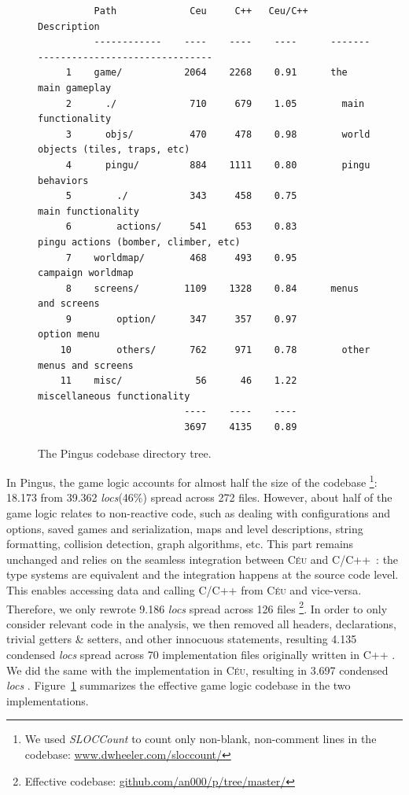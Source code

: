 \documentclass[10pt, conference, compsocconf]{IEEEtran}
\newcommand{\CEU}{\textsc{C\'{e}u}\xspace}
\newcommand{\locs}{\emph{locs}\xspace}
\begin{document}
\begin{figure}
{\footnotesize
\begin{verbatim}
          Path             Ceu     C++   Ceu/C++    Description
          ------------    ----    ----    ----      --------------------------------------
     1    game/           2064    2268    0.91      the main gameplay
     2      ./             710     679    1.05        main functionality
     3      objs/          470     478    0.98        world objects (tiles, traps, etc)
     4      pingu/         884    1111    0.80        pingu behaviors
     5        ./           343     458    0.75          main functionality
     6        actions/     541     653    0.83          pingu actions (bomber, climber, etc)
     7    worldmap/        468     493    0.95      campaign worldmap
     8    screens/        1109    1328    0.84      menus and screens
     9        option/      347     357    0.97        option menu
    10        others/      762     971    0.78        other menus and screens
    11    misc/             56      46    1.22      miscellaneous functionality
                          ----    ----    ----
                          3697    4135    0.89
\end{verbatim}
}
\caption{The Pingus codebase directory tree.
\label{tab.tree}
}
\end{figure}

In Pingus, the game logic accounts for almost half the size of the codebase%
\footnote{
We used \emph{SLOCCount} to count only non-blank, non-comment lines in the
codebase: \url{www.dwheeler.com/sloccount/}
}:
18.173 from 39.362 \locs (46\%) spread across 272 files.
%
However, about half of the game logic relates to non-reactive code, such as
dealing with configurations and options, saved games and serialization, maps
and level descriptions, string formatting, collision detection, graph
algorithms, etc.
This part remains unchanged and relies on the seamless integration between \CEU
and C/C++~\cite{ceu.sensys13}: the type systems are equivalent and the
integration happens at the source code level.
This enables accessing data and calling C/C++ from \CEU and vice-versa.
%
Therefore, we only rewrote 9.186 \locs spread across 126 files%
\footnote{\label{codebase} Effective codebase: \url{github.com/an000/p/tree/master/}}.
%
In order to only consider relevant code in the analysis, we then removed all
headers, declarations, trivial getters \& setters, and other innocuous
statements, resulting 4.135 condensed \locs spread across 70 implementation
files originally written in C++%
\footnotemark[\ref{codebase}].
We did the same with the implementation in \CEU, resulting in 3.697 condensed
\locs%
\footnotemark[\ref{codebase}].
%
Figure~\ref{tab.tree} summarizes the effective game logic codebase in the two
implementations.
\end{document}
